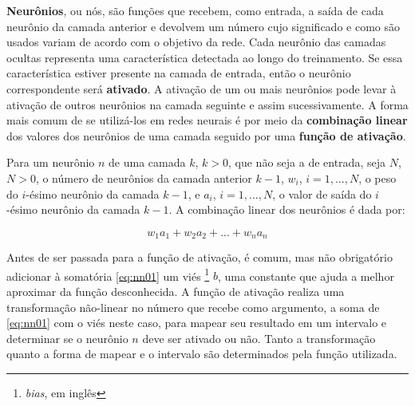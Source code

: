 \textbf{Neurônios}, ou nós, são funções que recebem, como entrada, a saída de cada neurônio da camada anterior e devolvem um número
cujo significado e como são usados variam de acordo com o objetivo da rede.
Cada neurônio das camadas ocultas representa uma característica detectada ao longo do treinamento.
Se essa característica estiver presente na camada de entrada, então o neurônio correspondente será \textbf{ativado}.
A ativação de um ou mais neurônios pode levar à ativação de outros neurônios na camada seguinte e assim sucessivamente.
A forma mais comum de se utilizá-los em redes neurais é por meio da \textbf{combinação linear} dos valores dos neurônios de uma camada seguido por uma \textbf{função de ativação}.

Para um neurônio $n$ de uma camada $k$, $k > 0$, que não seja a de entrada, seja $N$, $N > 0$, o número de neurônios da camada anterior $k-1$, $w_{i}$, $i = 1, ..., N$, o peso do $i$-ésimo neurônio da camada $k-1$, e $a_{i}$, $i = 1, ..., N$, o valor de saída do $i$-ésimo neurônio da camada $k-1$.
A combinação linear dos neurônios é dada por:

\begin{equation} \label{eq:nn01}
w_{1}a_{1} + w_{2}a_{2} + ... + w_{n}a_{n}
\end{equation}

Antes de ser passada para a função de ativação, é comum, mas não obrigatório adicionar à somatória \ref{eq:nn01} um viés \footnote{\textit{bias}, em inglês} $b$, uma constante que ajuda a melhor aproximar da função desconhecida.
A função de ativação realiza uma transformação não-linear no número que recebe como argumento, a soma de \ref{eq:nn01} com o viés neste caso, para mapear seu resultado em um intervalo e determinar se o neurônio $n$ deve ser ativado ou não.
Tanto a transformação quanto a forma de mapear e o intervalo são determinados pela função utilizada.

